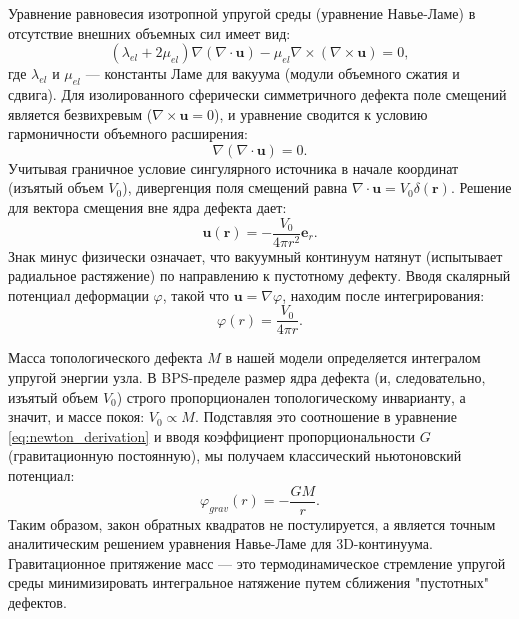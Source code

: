 \documentclass[12pt,a4paper]{article}
\begin{document}
Уравнение равновесия изотропной упругой среды (уравнение Навье-Ламе) в отсутствие внешних объемных сил имеет вид:
\begin{equation}
	(\lambda_{el} + 2\mu_{el}) \nabla (\nabla \cdot \mathbf{u}) - \mu_{el} \nabla \times (\nabla \times \mathbf{u}) = 0,
\end{equation}
где $\lambda_{el}$ и $\mu_{el}$ — константы Ламе для вакуума (модули объемного сжатия и сдвига). 
Для изолированного сферически симметричного дефекта поле смещений является безвихревым ($\nabla \times \mathbf{u} = 0$), и уравнение сводится к условию гармоничности объемного расширения:
\begin{equation}
	\nabla (\nabla \cdot \mathbf{u}) = 0.
\end{equation}
Учитывая граничное условие сингулярного источника в начале координат (изъятый объем $V_0$), дивергенция поля смещений равна $\nabla \cdot \mathbf{u} = V_0 \delta(\mathbf{r})$. Решение для вектора смещения вне ядра дефекта дает:
\begin{equation}
	\mathbf{u}(\mathbf{r}) = -\frac{V_0}{4\pi r^2} \mathbf{e}_r.
\end{equation}
Знак минус физически означает, что вакуумный континуум натянут (испытывает радиальное растяжение) по направлению к пустотному дефекту. Вводя скалярный потенциал деформации $\varphi$, такой что $\mathbf{u} = \nabla \varphi$, находим после интегрирования:
\begin{equation}
	\varphi(r) = \frac{V_0}{4\pi r}.
	\label{eq:newton_derivation}
\end{equation}

Масса топологического дефекта $M$ в нашей модели определяется интегралом упругой энергии узла. В BPS-пределе размер ядра дефекта (и, следовательно, изъятый объем $V_0$) строго пропорционален топологическому инварианту, а значит, и массе покоя: $V_0 \propto M$. Подставляя это соотношение в уравнение \eqref{eq:newton_derivation} и вводя коэффициент пропорциональности $G$ (гравитационную постоянную), мы получаем классический ньютоновский потенциал:
\begin{equation}
	\varphi_{grav}(r) = - \frac{G M}{r}.
\end{equation}
Таким образом, закон обратных квадратов не постулируется, а является точным аналитическим решением уравнения Навье-Ламе для 3D-континуума. Гравитационное притяжение масс — это термодинамическое стремление упругой среды минимизировать интегральное натяжение путем сближения "пустотных" дефектов.
\end{document}
